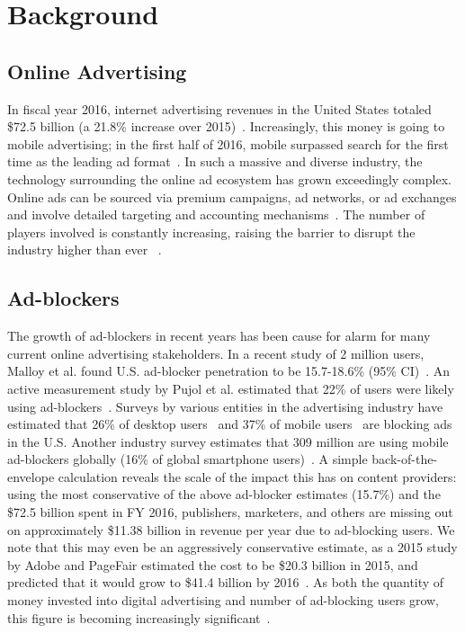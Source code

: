 \section{Background}
\subsection{Online Advertising}
In fiscal year 2016, internet advertising revenues in the United States totaled \$72.5 billion (a 21.8\% increase over 2015)~\cite{iabfy2016}.
Increasingly, this money is going to mobile advertising; in the first half of 2016, mobile surpassed search for the first time as the leading ad
format~\cite{iab2016}.
In such a massive and diverse industry, the technology surrounding the online ad ecosystem has grown exceedingly complex.
Online ads can be sourced via premium campaigns, ad networks, or ad exchanges and involve detailed targeting and accounting mechanisms~\cite{adscape}.
The number of players involved is constantly increasing, raising the barrier to disrupt the industry higher than ever ~\cite{lumascape}.

\subsection{Ad-blockers}
The growth of ad-blockers in recent years has been cause for alarm for many current online advertising stakeholders.
In a recent study of 2 million users, Malloy et al. found U.S. ad-blocker penetration to be 15.7-18.6\% (95\% CI)~\cite{malloy}.
An active measurement study by Pujol et al. estimated that 22\% of users were likely using ad-blockers~\cite{pujol}.
Surveys by various entities in the advertising industry have estimated that 26\% of desktop users~\cite{iab-blockers} and 37\% of mobile users~\cite{gwi} are blocking ads in the U.S.
Another industry survey estimates that 309 million are using mobile ad-blockers globally (16\% of global smartphone users)~\cite{pagefair}.
A simple back-of-the-envelope calculation reveals the scale of the impact this has on content providers: using the most conservative of the above ad-blocker estimates (15.7\%) and the \$72.5 billion spent in FY 2016, publishers, marketers, and others are missing out on approximately \$11.38 billion in revenue per year due to ad-blocking users.
We note that this may even be an aggressively conservative estimate, as a 2015 study by Adobe and PageFair estimated the cost to be \$20.3 billion in 2015, and predicted that it would grow to \$41.4 billion by 2016~\cite{pagefair2015cost}.
As both the quantity of money invested into digital advertising and number of ad-blocking users grow, this figure is becoming increasingly significant~\cite{iab2016}.


